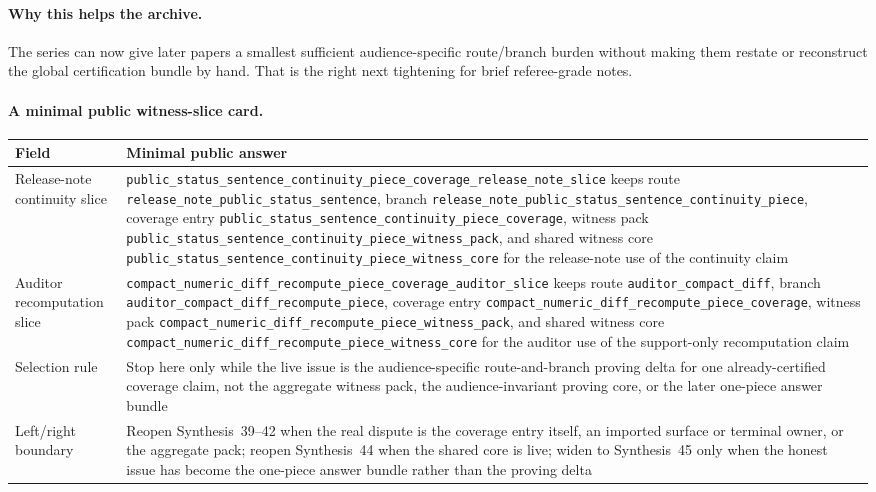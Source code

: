 \documentclass[11pt]{article}
\begin{document}
\paragraph{Why this helps the archive.}
The series can now give later papers a smallest sufficient audience-specific route/branch burden without making them restate or reconstruct the global certification bundle by hand.
That is the right next tightening for brief referee-grade notes.


\paragraph{A minimal public witness-slice card.}
\begin{table}[t]
\centering
\small
\begin{tabularx}{\linewidth}{@{}lX@{}}
\toprule
Field & Minimal public answer \\
\midrule
Release-note continuity slice & \nolinkurl{public_status_sentence_continuity_piece_coverage_release_note_slice} keeps route \nolinkurl{release_note_public_status_sentence}, branch \nolinkurl{release_note_public_status_sentence_continuity_piece}, coverage entry \nolinkurl{public_status_sentence_continuity_piece_coverage}, witness pack \nolinkurl{public_status_sentence_continuity_piece_witness_pack}, and shared witness core \nolinkurl{public_status_sentence_continuity_piece_witness_core} for the release-note use of the continuity claim \\
Auditor recomputation slice & \nolinkurl{compact_numeric_diff_recompute_piece_coverage_auditor_slice} keeps route \nolinkurl{auditor_compact_diff}, branch \nolinkurl{auditor_compact_diff_recompute_piece}, coverage entry \nolinkurl{compact_numeric_diff_recompute_piece_coverage}, witness pack \nolinkurl{compact_numeric_diff_recompute_piece_witness_pack}, and shared witness core \nolinkurl{compact_numeric_diff_recompute_piece_witness_core} for the auditor use of the support-only recomputation claim \\
Selection rule & Stop here only while the live issue is the audience-specific route-and-branch proving delta for one already-certified coverage claim, not the aggregate witness pack, the audience-invariant proving core, or the later one-piece answer bundle \\
Left/right boundary & Reopen Synthesis~39--42 when the real dispute is the coverage entry itself, an imported surface or terminal owner, or the aggregate pack; reopen Synthesis~44 when the shared core is live; widen to Synthesis~45 only when the honest issue has become the one-piece answer bundle rather than the proving delta \\

\end{tabularx}
\end{table}
\end{document}
